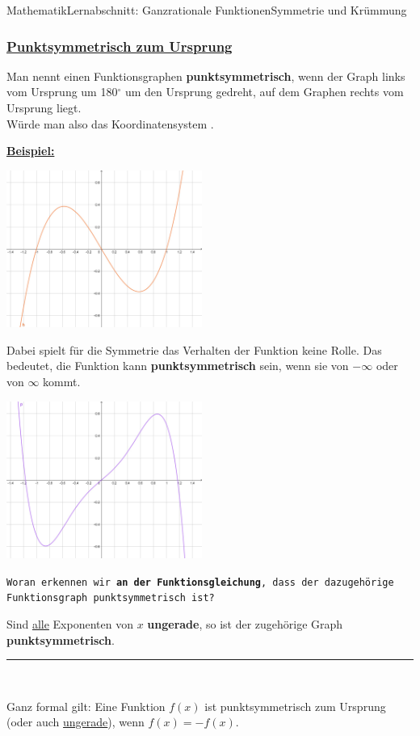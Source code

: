 \documentclass[11pt,twocolumn,oneside,openany,headings=optiontotoc,11pt,numbers=noenddot]{article}
\begin{document}
\begin{worksheet}{Mathematik}{Lernabschnitt: Ganzrationale Funktionen}{Symmetrie und Krümmung}
		\subsubsection{\underline{Punktsymmetrisch zum Ursprung}}
		Man nennt einen Funktionsgraphen \textbf{punktsymmetrisch}, wenn  der Graph links vom Ursprung um 180\(^{\circ}\) um den Ursprung gedreht, auf dem Graphen rechts vom Ursprung liegt.\\
		Würde man also das Koordinatensystem .\\
		\par\noindent
		\underline{\textbf{Beispiel:}}\\
		\par\noindent
		\includegraphics[width=0.48\textwidth]{../99_Bilder/psymm.jpg}\\
		\par\noindent
		Dabei spielt für die Symmetrie das Verhalten der Funktion keine Rolle. Das bedeutet, die Funktion kann \textbf{punktsymmetrisch} sein, wenn sie von \(-\infty\) oder von \(\infty\) kommt.\\
		\par\noindent
		\includegraphics[width=0.48\textwidth]{../99_Bilder/psymm_2.jpg}\\
		\par\noindent
		\texttt{Woran erkennen wir \textbf{an der Funktionsgleichung}, dass der dazugehörige Funktionsgraph punktsymmetrisch ist?}
		\begin{framed}
			Sind \underline{alle} Exponenten von \(x\) \textbf{ungerade}, so ist der zugehörige Graph \textbf{punktsymmetrisch}.\\
			\par\noindent
			\rule{\textwidth}{0.1pt}\\
			\par\noindent
			Ganz formal gilt: Eine Funktion \(f(x)\) ist punktsymmetrisch zum Ursprung (oder auch \underline{ungerade}), wenn \(f(x) = -f(x)\).
		\end{framed}

\end{worksheet}
\end{document}

